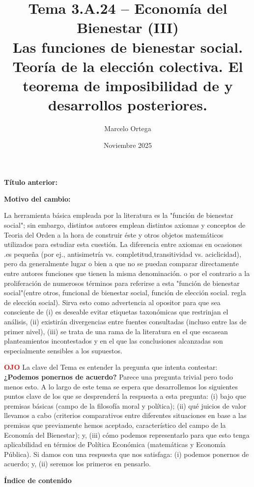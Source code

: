 \documentclass[10pt,a4paper]{article}
\title{Tema 3.A.24 -- Economía del Bienestar (III)\\
\large Las funciones de bienestar social. Teoría de la elección colectiva. El teorema de imposibilidad de \authorfont{ARROW} y desarrollos posteriores.}
\author{Marcelo Ortega}
\date{Noviembre 2025}
\makeatletter
\newcommand{\puntosclave}[1]{%
  \begin{tcolorbox}[
    colframe=black,
    title={Puntos clave},
    before upper={\setlength{\parindent}{0.5cm}\setlength{\parskip}{0.5\baselineskip}}
  ]
  #1
  \end{tcolorbox}
}
\newcommand{\modificaciones}[1]{
  \begin{tcolorbox}[
    colback=white,
    colframe=red,
    title={Modificaciones a realizar},
    before upper={\setlength{\parindent}{0.5cm}\setlength{\parskip}{0.5\baselineskip}}
  ]
  #1
  \end{tcolorbox}
}
\newcommand{\changebox}{%
\begin{tcolorbox}[title={Historial de cambios del tema}]
\textbf{Título anterior:} \OldTitle\par
\textbf{Motivo del cambio:} \ChangeWhy
\end{tcolorbox}
}
\newcommand{\MyTOC}{%
  \par\bigskip
  {\centering\bfseries\Large Índice de contenido\par}%
  \medskip
  \begingroup
    \parindent=0pt\parskip=2pt
    \@starttoc{stc}%
  \endgroup
}
\makeatother
\begin{document}
\maketitle
\changebox

\newpage

\puntosclave{
    La herramienta básica empleada por la literatura es la "función de bienestar social"; sin embargo, distintos autores emplean distintos axiomas y conceptos de Teoria del Orden a la hora de construir éste y otros objetos matemáticos utilizados para estudiar esta cuestión. La diferencia entre axiomas en ocasiones .es pequeña (por ej., antisimetría vs. completitud,transitividad vs. aciclicidad), pero da generalmente lugar o bien a que no se puedan comparar directamente entre autores funciones que tienen la misma denominación. o por el contrario a la proliferación de numerosos términos para referirse a esta "función de bienestar social"(entre otros, funcional de bienestar social, función de elección social. regla de elección social). Sirva esto como advertencia al opositor para que sea consciente de (i) es deseable evitar etiquetas taxonómicas que restrinjan el análisis, (ii) existirán divergencias entre fuentes consultadas (incluso entre las de primer nivel), (iii) se trata de una rama de la literatura en el que escasean planteamientos incontestados y en el que las conclusiones alcanzadas son especialmente sensibles a los supuestos.

    \textcolor{red}{\textbf{OJO}} La clave del Tema es entender la pregunta que intenta contestar: \textbf{¿Podemos ponernos de acuerdo?} Parece una pregunta trivial pero todo menos esto. A lo largo de este tema se espera que desarrollemos los siguientes puntos clave de los que se desprenderá la respuesta a esta pregunta: (i) bajo que premisas básicas (campo de la filosofía moral y política); (ii) qué juicios de valor llevamos a cabo (criterios comparativos entre diferentes situaciones en base a las premisas que previamente hemos aceptado, característico del campo de la Economía del Bienestar); y, (iii) cómo podemos representarlo para que esto tenga aplicabilidad en térmios de Política Económica (matemáticas y Economía Pública). Si damos con una respuesta que nos satisfaga: (i) podemos ponernos de acuerdo; y, (ii) seremos los primeros en pensarlo.
    }
\vspace{1cm}
\modificaciones{
    
    }

\newpage
\MyTOC
\newpage
\end{document}
